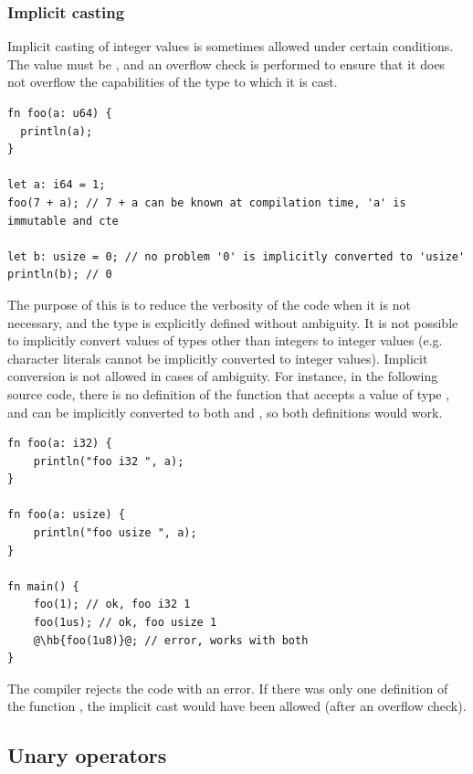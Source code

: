 \subsubsection{Implicit casting}

Implicit casting of integer values is sometimes allowed under certain
conditions. The value must be , and an overflow check is performed
to ensure that it does not overflow the capabilities of the type to which it is
cast.

  \begin{lstlisting}[style=coloredverbatim]
fn foo(a: u64) {
  println(a);
}

let a: i64 = 1;
foo(7 + a); // 7 + a can be known at compilation time, 'a' is immutable and cte

let b: usize = 0; // no problem '0' is implicitly converted to 'usize'
println(b); // 0
  \end{lstlisting}

The purpose of this is to reduce the verbosity of the code when it is not
necessary, and the type is explicitly defined without ambiguity. It is not
possible to implicitly convert values of types other than integers to integer
values (e.g. character literals cannot be implicitly converted to integer
values). Implicit conversion is not allowed in cases of ambiguity. For instance,
in the following source code, there is no definition of the function
 that accepts a value of type , and  can be
implicitly converted to both  and , so both definitions
would work.

\begin{lstlisting}[style=coloredverbatimError, escapechar=@]
fn foo(a: i32) {
    println("foo i32 ", a);
}

fn foo(a: usize) {
    println("foo usize ", a);
}

fn main() {
    foo(1); // ok, foo i32 1
    foo(1us); // ok, foo usize 1
    @\hb{foo(1u8)}@; // error, works with both
}
  \end{lstlisting}

The compiler rejects the code with an error. If there was only one definition of
the function , the implicit cast would have been allowed (after an
overflow check).

\subsection{Unary operators}

